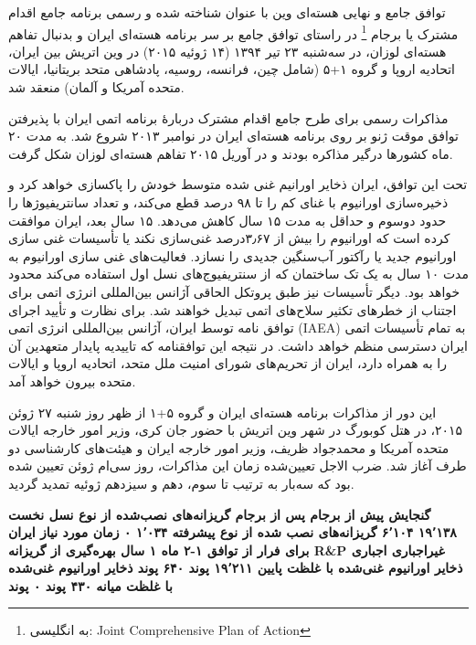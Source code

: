 
توافق جامع و نهایی هسته‌ای وین با عنوان شناخته شده و رسمی برنامه جامع اقدام مشترک یا برجام
\footnote{به انگلیسی: Joint Comprehensive Plan of Action}
 در راستای توافق جامع بر سر برنامه هسته‌ای ایران و بدنبال تفاهم هسته‌ای لوزان، در سه‌شنبه ۲۳ تیر ۱۳۹۴ (۱۴ ژوئیه ۲۰۱۵) در وین اتریش بین ایران، اتحادیه اروپا و گروه ۱+۵ (شامل چین، فرانسه، روسیه، پادشاهی متحد بریتانیا، ایالات متحده آمریکا و آلمان) منعقد شد.

مذاکرات رسمی برای طرح جامع اقدام مشترک دربارهٔ برنامه اتمی ایران با پذیرفتن توافق موقت ژنو بر روی برنامه هسته‌ای ایران در نوامبر ۲۰۱۳ شروع شد. به مدت ۲۰ ماه کشورها درگیر مذاکره بودند و در آوریل ۲۰۱۵ تفاهم هسته‌ای لوزان شکل گرفت.

تحت این توافق، ایران ذخایر اورانیم غنی شده متوسط خودش را پاکسازی خواهد کرد و ذخیره‌سازی اورانیوم با غنای کم را تا ۹۸ درصد قطع می‌کند، و تعداد سانتریفیوژها را حدود دوسوم و حداقل به مدت ۱۵ سال کاهش می‌دهد. ۱۵ سال بعد، ایران موافقت کرده است که اورانیوم را بیش از ۳٫۶۷درصد غنی‌سازی نکند یا تأسیسات غنی سازی اورانیوم جدید یا رآکتور آب‌سنگین جدیدی را نسازد. فعالیت‌های غنی سازی اورانیوم به مدت ۱۰ سال به یک تک ساختمان که از سنتریفیوج‌های نسل اول استفاده می‌کند محدود خواهد بود. دیگر تأسیسات نیز طبق پروتکل الحاقی آژانس بین‌المللی انرژی اتمی برای اجتناب از خطرهای تکثیر سلاح‌های اتمی تبدیل خواهند شد. برای نظارت و تأیید اجرای توافق نامه توسط ایران، آژانس بین‌المللی انرژی اتمی (IAEA) به تمام تأسیسات اتمی ایران دسترسی منظم خواهد داشت. در نتیجه این توافقنامه که تاییدیه پایدار متعهدین آن را به همراه دارد، ایران از تحریم‌های شورای امنیت ملل متحد، اتحادیه اروپا و ایالات متحده بیرون خواهد آمد.

این دور از مذاکرات برنامه هسته‌ای ایران و گروه ۵+۱ از ظهر روز شنبه ۲۷ ژوئن ۲۰۱۵، در هتل کوبورگ در شهر وین اتریش با حضور جان کری، وزیر امور خارجه ایالات متحده آمریکا و محمدجواد ظریف، وزیر امور خارجه ایران و هیئت‌های کارشناسی دو طرف آغاز شد. ضرب الاجل تعیین‌شده زمان این مذاکرات، روز سی‌ام ژوئن تعیین شده بود که سه‌بار به ترتیب تا سوم، دهم و سیزدهم ژوئیه تمدید گردید.


\startplacetable[location=force,number=no]
\righttoleft
\starttabulate[format={|c|c|c|},align=middle]
\HL
\NC\bf
گنجایش
\NC\bf
پیش از برجام
\NC\bf
پس از برجام
\NC
\NR
\HL
\NC
گریزانه‌های نصب‌شده از نوع نسل نخست
\NC
۱۹٬۱۳۸
\NC
۶٬۱۰۴
\NC
\NR
\NC
گریزانه‌های نصب شده از نوع پیشرفته
\NC
۱٬۰۳۴
\NC
۰
\NC
\NR
\NC
زمان مورد نیاز ایران برای فرار از توافق
\NC
۱-۲ ماه
\NC
۱ سال
\NC
\NR
\NC
بهره‌گیری از گریزانه R\&P
\NC
غیراجباری
\NC
اجباری
\NC
\NR
\NC
ذخایر اورانیوم غنی‌شده با غلظت پایین
\NC
۱۹٬۲۱۱ پوند
\NC
۶۴۰ پوند
\NC
\NR
\NC
ذخایر اورانیوم غنی‌شده با غلظت میانه
\NC
۴۳۰ پوند
\NC
۰ پوند
\NC
\NR
\HL
\stoptabulate
\stopplacetable
